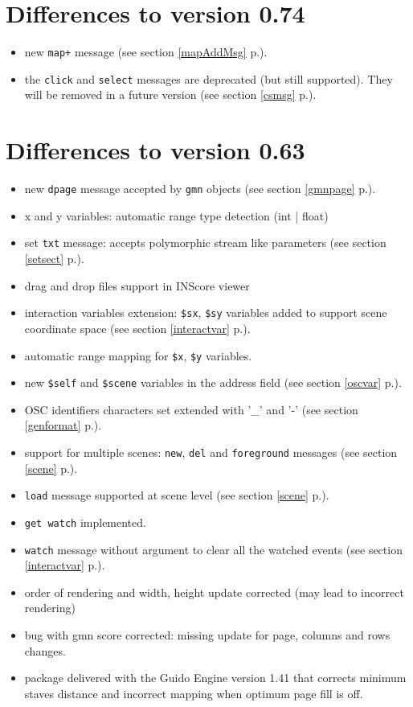 \documentclass[a4paper,twoside]{report}
\newcommand{\sublevel}[1]	{\section{#1}}
\newcommand{\fullref}[1]	{\ref{#1} p.\pageref{#1}}
\newcommand{\OSC}[1]		{\texttt{#1}}
\begin{document}
\sublevel{Differences to version 0.74}
\begin{itemize}
\item new \OSC{map+} message  (see section \fullref{mapAddMsg}).
\item the \OSC{click} and \OSC{select} messages are deprecated (but still supported). They will be removed in a future version (see section \fullref{csmsg}).
\end{itemize}

\sublevel{Differences to version 0.63}
\begin{itemize}
\item new \OSC{dpage} message accepted by \OSC{gmn} objects (see section \fullref{gmnpage}).
\item x and y variables: automatic range type detection (int | float)
\item set \OSC{txt} message: accepts polymorphic stream like parameters (see section \fullref{setsect}).
\item drag and drop files support in INScore viewer
\item interaction variables extension: \OSC{\$sx}, \OSC{\$sy} variables added to support scene coordinate space (see section \fullref{interactvar}).
\item automatic range mapping for \OSC{\$x}, \OSC{\$y} variables.
\item new \OSC{\$self} and \OSC{\$scene} variables in the address field (see section \fullref{oscvar}).
\item OSC identifiers characters set extended with '\_' and '-' (see section \fullref{genformat}).
\item support for multiple scenes: \OSC{new}, \OSC{del} and \OSC{foreground} messages (see section \fullref{scene}).
\item \OSC{load} message supported at scene level (see section \fullref{scene}).
\item \OSC{get watch} implemented.
\item \OSC{watch} message without argument to clear all the watched events (see section \fullref{interactvar}).
\item order of rendering and width, height update corrected (may lead to incorrect rendering)
\item bug with gmn score corrected: missing update for page, columns and rows changes.
\item package delivered with the Guido Engine version 1.41 that corrects minimum staves distance and incorrect mapping when optimum page fill is off.
\end{itemize}
\end{document}
